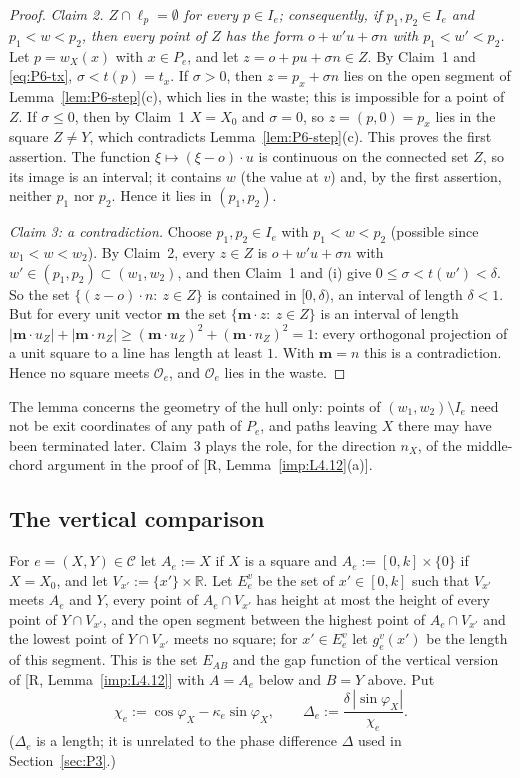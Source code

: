 \documentclass[11pt]{amsart}
\newcommand{\R}{\mathbb R}
\theoremstyle{definition}
\theoremstyle{remark}
\numberwithin{equation}{section}
\begin{document}
\begin{proof}
\emph{Claim 2. $Z\cap\ell_p=\emptyset$ for every $p\in I_e$; consequently, if $p_1,p_2\in I_e$ and $p_1<w<p_2$, then
every point of $Z$ has the form $o+w'u+\sigma n$ with $p_1<w'<p_2$.}
Let $p=w_X(x)$ with $x\in P_e$, and let $z=o+pu+\sigma n\in Z$. By Claim~1 and \eqref{eq:P6-tx}, $\sigma<t(p)=t_x$. If
$\sigma>0$, then $z=p_x+\sigma n$ lies on the open segment of Lemma~\ref{lem:P6-step}(c), which lies in the waste;
this is impossible for a point of $Z$. If $\sigma\le0$, then by Claim~1 $X=X_0$ and $\sigma=0$, so $z=(p,0)=p_x$ lies
in the square $Z\neq Y$, which contradicts Lemma~\ref{lem:P6-step}(c). This proves the first assertion. The function
$\xi\mapsto(\xi-o)\cdot u$ is continuous on the connected set $Z$, so its image is an interval; it contains $w$ (the
value at $v$) and, by the first assertion, neither $p_1$ nor $p_2$. Hence it lies in $(p_1,p_2)$.

\emph{Claim 3: a contradiction.} Choose $p_1,p_2\in I_e$ with $p_1<w<p_2$ (possible since $w_1<w<w_2$). By Claim~2,
every $z\in Z$ is $o+w'u+\sigma n$ with $w'\in(p_1,p_2)\subset(w_1,w_2)$, and then Claim~1 and (i) give
$0\le\sigma<t(w')<\delta$. So the set $\{(z-o)\cdot n:\ z\in Z\}$ is contained in $[0,\delta)$, an interval of length
$\delta<1$. But for every unit vector $\mathbf m$ the set $\{\mathbf m\cdot z:\ z\in Z\}$ is an interval of length
$|\mathbf m\cdot u_Z|+|\mathbf m\cdot n_Z|\ge(\mathbf m\cdot u_Z)^2+(\mathbf m\cdot n_Z)^2=1$: every orthogonal
projection of a unit square to a line has length at least $1$. With $\mathbf m=n$ this is a contradiction. Hence no
square meets $\mathcal O_e$, and $\mathcal O_e$ lies in the waste.
\end{proof}

The lemma concerns the geometry of the hull only: points of $(w_1,w_2)\setminus I_e$ need not be exit coordinates of
any path of $P_e$, and paths leaving $X$ there may have been terminated later. Claim~3 plays the role, for the
direction $n_X$, of the middle-chord argument in the proof of [R, Lemma~\ref{imp:L4.12}(a)].

\subsection{The vertical comparison}\label{ssec:P6-vertical}

For $e=(X,Y)\in\mathcal C$ let $A_e:=X$ if $X$ is a square and $A_e:=[0,k]\times\{0\}$ if $X=X_0$, and let
$V_{x'}:=\{x'\}\times\R$. Let $E^v_e$ be the set of $x'\in[0,k]$ such that $V_{x'}$ meets $A_e$ and $Y$, every point
of $A_e\cap V_{x'}$ has height at most the height of every point of $Y\cap V_{x'}$, and the open segment between the
highest point of $A_e\cap V_{x'}$ and the lowest point of $Y\cap V_{x'}$ meets no square; for $x'\in E^v_e$ let
$g^v_e(x')$ be the length of this segment. This is the set $E_{AB}$ and the gap function of the vertical version of
[R, Lemma~\ref{imp:L4.12}] with $A=A_e$ below and $B=Y$ above. Put
\[
\chi_e:=\cos\varphi_X-\kappa_e\sin\varphi_X,\qquad \Delta_e:=\frac{\delta\,|\sin\varphi_X|}{\chi_e}.
\]
($\Delta_e$ is a length; it is unrelated to the phase difference $\Delta$ used in Section~\ref{sec:P3}.)
\end{document}
